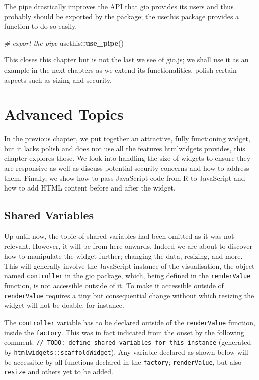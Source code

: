 \documentclass[10pt,]{krantz}
\makeatletter
\newenvironment{Shaded}{\begin{snugshade}}{\end{snugshade}}
\newcommand{\CommentTok}[1]{\textcolor[rgb]{0.37,0.37,0.37}{\textit{#1}}}
\newcommand{\KeywordTok}[1]{\textcolor[rgb]{0.27,0.27,0.27}{\textbf{#1}}}
\newcommand{\NormalTok}[1]{#1}
\newcommand{\OperatorTok}[1]{\textcolor[rgb]{0.43,0.43,0.43}{\textbf{#1}}}
\newenvironment{kframe}{%
\medskip{}
\setlength{\fboxsep}{.8em}
 \def\at@end@of@kframe{}%
 \ifinner\ifhmode%
  \def\at@end@of@kframe{\end{minipage}}%
  \begin{minipage}{\columnwidth}%
 \fi\fi%
 \def\FrameCommand##1{\hskip\@totalleftmargin \hskip-\fboxsep
 \colorbox{shadecolor}{##1}\hskip-\fboxsep
     \hskip-\linewidth \hskip-\@totalleftmargin \hskip\columnwidth}%
 \MakeFramed {\advance\hsize-\width
   \@totalleftmargin\z@ \linewidth\hsize
   \@setminipage}}%
 {\par\unskip\endMakeFramed%
 \at@end@of@kframe}
\renewenvironment{Shaded}{\begin{kframe}}{\end{kframe}}
\makeatother
\begin{document}
The pipe drastically improves the API that gio provides its users and thus probably should be exported by the package; the usethis package provides a function to do so easily.

\begin{Shaded}
\begin{Highlighting}[]
\CommentTok{# export the pipe}
\NormalTok{usethis}\OperatorTok{::}\KeywordTok{use_pipe}\NormalTok{()}
\end{Highlighting}
\end{Shaded}

This closes this chapter but is not the last we see of gio.js; we shall use it as an example in the next chapters as we extend its functionalities, polish certain aspects such as sizing and security.

\hypertarget{widgets-adv}{%
\chapter{Advanced Topics}\label{widgets-adv}}

In the previous chapter, we put together an attractive, fully functioning widget, but it lacks polish and does not use all the features htmlwidgets provides, this chapter explores those. We look into handling the size of widgets to ensure they are responsive as well as discuss potential security concerns and how to address them. Finally, we show how to pass JavaScript code from R to JavaScript and how to add HTML content before and after the widget.

\hypertarget{widgets-adv-shared}{%
\section{Shared Variables}\label{widgets-adv-shared}}

Up until now, the topic of shared variables had been omitted as it was not relevant. However, it will be from here onwards. Indeed we are about to discover how to manipulate the widget further; changing the data, resizing, and more. This will generally involve the JavaScript instance of the visualisation, the object named \texttt{controller} in the gio package, which, being defined in the \texttt{renderValue} function, is not accessible outside of it. To make it accessible outside of \texttt{renderValue} requires a tiny but consequential change without which resizing the widget will not be doable, for instance.

The \texttt{controller} variable has to be declared outside of the \texttt{renderValue} function, inside the \texttt{factory}. This was in fact indicated from the onset by the following comment: \texttt{//\ TODO:\ define\ shared\ variables\ for\ this\ instance} (generated by \texttt{htmlwidgets::scaffoldWidget}). Any variable declared as shown below will be accessible by all functions declared in the \texttt{factory}; \texttt{renderValue}, but also \texttt{resize} and others yet to be added.
\end{document}
